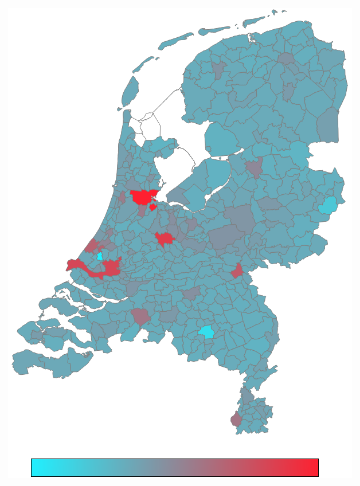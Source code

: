 \documentclass[a4paper,twoside,11pt]{article}
\begin{document}
\begin{figure}[h]
\begin{subfigure}[b]{0.12\textwidth}
                \includegraphics[width=\textwidth]{Heatmaps/HeatMap5.png}
                \caption{}
                \label{fig:MaleFemale}
        \end{subfigure}%
        \begin{subfigure}[b]{0.12\textwidth}

\end{subfigure}
\end{figure}
\end{document}
